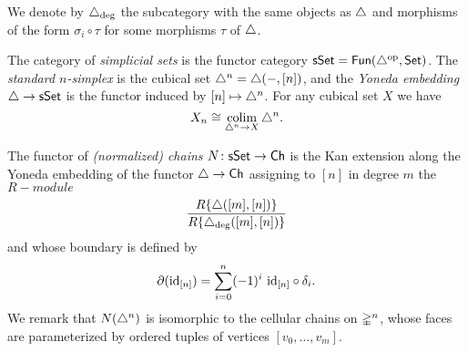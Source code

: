 We denote by $\triangle_{\deg}$ the subcategory with the same objects as $\triangle$ and morphisms of the form $\sigma_i \circ \tau$ for some morphisms $\tau$ of $\triangle$.

The category of \textit{simplicial sets} is the functor category $\mathsf{sSet} = \mathsf{Fun}(\triangle^{\mathrm{op}}, \mathsf{Set})$.
The \textit{standard $n$-simplex} is the cubical set $\triangle^n = \triangle(-, [n])$, and the \textit{Yoneda embedding} $\triangle \to \mathsf{sSet}$ is the functor induced by $[n] \mapsto \triangle^n$.
For any cubical set $X$ we have
\begin{equation*}
X_n \cong \operatorname*{colim}_{\triangle^n \to X} \triangle^n.
\end{equation*}

The functor of \textit{(normalized) chains} $N \colon \mathsf{sSet} \to \mathsf{Ch}$ is the Kan extension along the Yoneda embedding of the functor $\triangle \to \mathsf{Ch}$ assigning to $[n]$ in degree $m$ the $R-module$
\begin{equation*}
\frac{R\{\triangle([m], [n])\}}{R\{\triangle_{\deg}([m], [n])\}}
\end{equation*}
and whose boundary is defined by
\begin{equation*}
\partial (\mathrm{id}_{[n]}) = \sum_{i=0}^{n} (-1)^i \ \mathrm{id}_{[n]} \circ \delta_i.
\end{equation*}
We remark that $N(\triangle^n)$ is isomorphic to the cellular chains on $\mathbb{\Delta}^n$, whose faces are parameterized by ordered tuples of vertices $[v_0, \dots, v_m]$.

